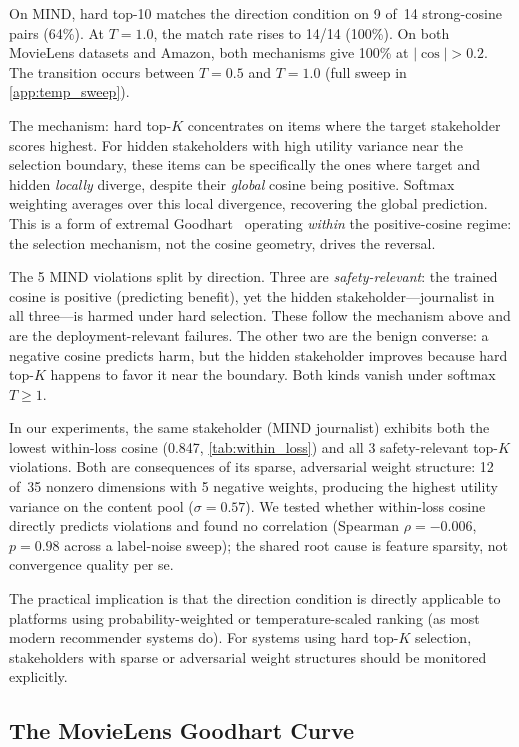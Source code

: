 \documentclass[11pt,letterpaper]{article}
\begin{document}
On MIND, hard top-10 matches the direction condition on 9 of~14
strong-cosine pairs (64\%). At $T = 1.0$, the match rate rises to
14/14 (100\%). On both MovieLens datasets and Amazon, both mechanisms
give 100\% at $|\cos| > 0.2$. The transition occurs between
$T = 0.5$ and $T = 1.0$ (full sweep in \cref{app:temp_sweep}).

The mechanism: hard top-$K$ concentrates on items where the target
stakeholder scores highest. For hidden stakeholders with high utility
variance near the selection boundary, these items can be specifically
the ones where target and hidden \emph{locally} diverge, despite their
\emph{global} cosine being positive. Softmax weighting averages over
this local divergence, recovering the global prediction. This is a form
of extremal Goodhart~\cite{skalse2024goodhart} operating \emph{within}
the positive-cosine regime: the selection mechanism, not the cosine
geometry, drives the reversal.

The 5 MIND violations split by direction. Three are
\emph{safety-relevant}: the trained cosine is positive (predicting
benefit), yet the hidden stakeholder---journalist in all three---is
harmed under hard selection. These follow the mechanism above and are
the deployment-relevant failures. The other two are the benign
converse: a negative cosine predicts harm, but the hidden stakeholder
improves because hard top-$K$ happens to favor it near the boundary.
Both kinds vanish under softmax $T \geq 1$.

In our experiments, the same stakeholder (MIND journalist) exhibits
both the lowest within-loss cosine (0.847, \cref{tab:within_loss}) and
all 3 safety-relevant top-$K$ violations. Both are consequences of its sparse,
adversarial weight structure: 12 of~35 nonzero dimensions with 5
negative weights, producing the highest utility variance on the content
pool ($\sigma = 0.57$). We tested whether within-loss cosine directly
predicts violations and found no correlation (Spearman $\rho = -0.006$,
$p = 0.98$ across a label-noise sweep); the shared root cause is
feature sparsity, not convergence quality per se.

The practical implication is that the direction condition is directly
applicable to platforms using probability-weighted or temperature-scaled
ranking (as most modern recommender systems do). For systems using hard
top-$K$ selection, stakeholders with sparse or adversarial weight
structures should be monitored explicitly.

\subsection{The MovieLens Goodhart Curve}
\end{document}
